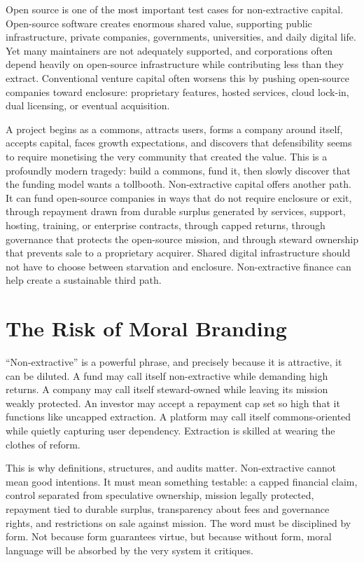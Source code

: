 \documentclass[11pt,a4paper,oneside]{book}
\begin{document}
Open source is one of the most important test cases for non-extractive capital. Open-source software creates enormous shared value, supporting public infrastructure, private companies, governments, universities, and daily digital life. Yet many maintainers are not adequately supported, and corporations often depend heavily on open-source infrastructure while contributing less than they extract. Conventional venture capital often worsens this by pushing open-source companies toward enclosure: proprietary features, hosted services, cloud lock-in, dual licensing, or eventual acquisition.

A project begins as a commons, attracts users, forms a company around itself, accepts capital, faces growth expectations, and discovers that defensibility seems to require monetising the very community that created the value. This is a profoundly modern tragedy: build a commons, fund it, then slowly discover that the funding model wants a tollbooth. Non-extractive capital offers another path. It can fund open-source companies in ways that do not require enclosure or exit, through repayment drawn from durable surplus generated by services, support, hosting, training, or enterprise contracts, through capped returns, through governance that protects the open-source mission, and through steward ownership that prevents sale to a proprietary acquirer. Shared digital infrastructure should not have to choose between starvation and enclosure. Non-extractive finance can help create a sustainable third path.

\section*{The Risk of Moral Branding}

``Non-extractive'' is a powerful phrase, and precisely because it is attractive, it can be diluted. A fund may call itself non-extractive while demanding high returns. A company may call itself steward-owned while leaving its mission weakly protected. An investor may accept a repayment cap set so high that it functions like uncapped extraction. A platform may call itself commons-oriented while quietly capturing user dependency. Extraction is skilled at wearing the clothes of reform.

This is why definitions, structures, and audits matter. Non-extractive cannot mean good intentions. It must mean something testable: a capped financial claim, control separated from speculative ownership, mission legally protected, repayment tied to durable surplus, transparency about fees and governance rights, and restrictions on sale against mission. The word must be disciplined by form. Not because form guarantees virtue, but because without form, moral language will be absorbed by the very system it critiques.
\end{document}
